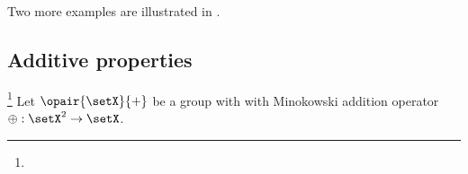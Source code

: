\begin{example}
\label{ex:mph_circle+square}
Two more examples are illustrated in .
\end{example}

\subsection{Additive properties}
\begin{theorem}
\label{thm:mph_add}
\footnote{
  }
Let $\opair{\setX}{+}$ be a group with with Minokowski addition operator $\oplus:\setX^2\to\setX$.
\end{theorem}
